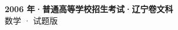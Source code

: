 \documentclass[zihao=-4, a4paper]{ctexart}
\begin{document}
\begin{center}
  {\Large\bfseries 2006 年·普通高等学校招生考试·辽宁卷文科}\\[4pt]
  {\large 数学 · 试题版}
\end{center}
\medskip
{}

\end{document}
